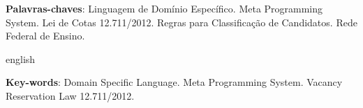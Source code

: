 \begin{resumo}[Resumo]

 \vspace{\onelineskip}
    
 \noindent
 \textbf{Palavras-chaves}: Linguagem de Domínio Específico. Meta Programming System. Lei de Cotas 12.711/2012. Regras para Classificação de Candidatos. Rede Federal de Ensino.
\end{resumo}



\begin{resumo}[Abstract]
\begin{otherlanguage*}{english}

 \noindent
\lipsum[5]

   \vspace{\onelineskip}
 
   \noindent 
   \textbf{Key-words}: Domain Specific Language. Meta Programming System. Vacancy Reservation Law 12.711/2012.
 \end{otherlanguage*}
 \end{resumo}
